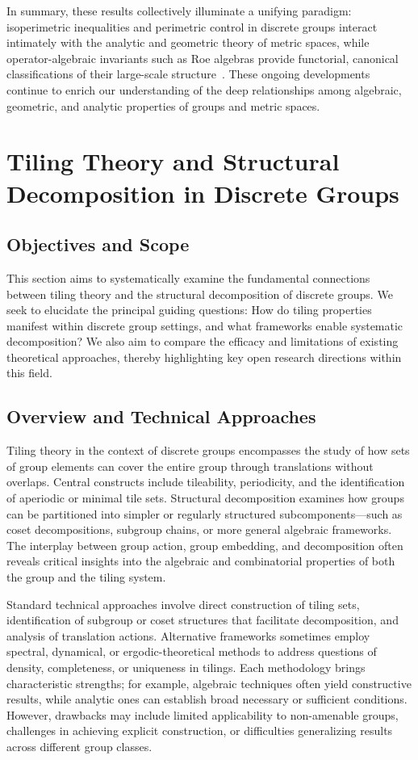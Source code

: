 \documentclass[sigconf]{acmart}
\begin{document}
In summary, these results collectively illuminate a unifying paradigm: isoperimetric inequalities and perimetric control in discrete groups interact intimately with the analytic and geometric theory of metric spaces, while operator-algebraic invariants such as Roe algebras provide functorial, canonical classifications of their large-scale structure~\cite{ref51,ref52,ref108}. These ongoing developments continue to enrich our understanding of the deep relationships among algebraic, geometric, and analytic properties of groups and metric spaces.

\section{Tiling Theory and Structural Decomposition in Discrete Groups}

\subsection*{Objectives and Scope}

This section aims to systematically examine the fundamental connections between tiling theory and the structural decomposition of discrete groups. We seek to elucidate the principal guiding questions: How do tiling properties manifest within discrete group settings, and what frameworks enable systematic decomposition? We also aim to compare the efficacy and limitations of existing theoretical approaches, thereby highlighting key open research directions within this field.

\subsection*{Overview and Technical Approaches}

Tiling theory in the context of discrete groups encompasses the study of how sets of group elements can cover the entire group through translations without overlaps. Central constructs include tileability, periodicity, and the identification of aperiodic or minimal tile sets. Structural decomposition examines how groups can be partitioned into simpler or regularly structured subcomponents—such as coset decompositions, subgroup chains, or more general algebraic frameworks. The interplay between group action, group embedding, and decomposition often reveals critical insights into the algebraic and combinatorial properties of both the group and the tiling system.

Standard technical approaches involve direct construction of tiling sets, identification of subgroup or coset structures that facilitate decomposition, and analysis of translation actions. Alternative frameworks sometimes employ spectral, dynamical, or ergodic-theoretical methods to address questions of density, completeness, or uniqueness in tilings. Each methodology brings characteristic strengths; for example, algebraic techniques often yield constructive results, while analytic ones can establish broad necessary or sufficient conditions. However, drawbacks may include limited applicability to non-amenable groups, challenges in achieving explicit construction, or difficulties generalizing results across different group classes.
\end{document}
